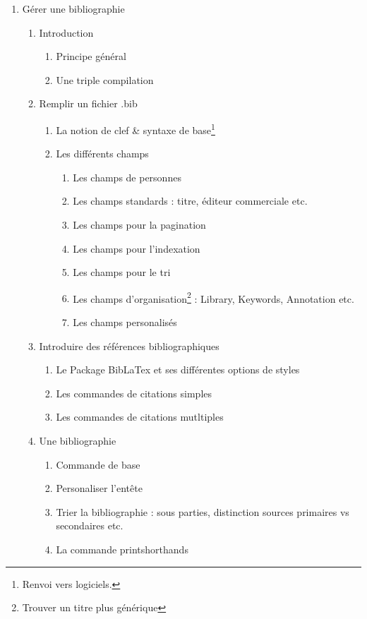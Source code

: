 \begin{enumerate}
\item{Gérer une bibliographie}
\begin{enumerate}
\item Introduction
	\begin{enumerate}
		\item{Principe général}
		\item{Une triple compilation}
	\end{enumerate}
\item Remplir un fichier .bib
	\begin{enumerate}
	\item La notion de clef \& syntaxe de base\footnote{Renvoi vers logiciels.}
	\item Les différents champs
		\begin{enumerate}
			\item Les champs de personnes
			\item Les champs standards : titre, éditeur commerciale etc.
			\item Les champs pour la pagination
			\item Les champs pour l'indexation
			\item Les champs pour le tri
			\item Les champs d'organisation\footnote{Trouver un titre plus générique} : Library, Keywords, Annotation etc.
			\item Les champs personalisés
		\end{enumerate} 
	\end{enumerate}
\item{Introduire des références bibliographiques}
	\begin{enumerate}
	\item Le Package BibLaTex et ses différentes options de styles
	\item Les commandes de citations simples
	\item Les commandes de citations mutltiples
	\end{enumerate}
\item Une bibliographie
	\begin{enumerate}
	\item Commande de base
	\item Personaliser l'entête
	\item Trier la bibliographie : sous parties, distinction sources primaires vs secondaires etc.
	\item La commande printshorthands
	\end{enumerate}


\end{enumerate}
\end{enumerate}
